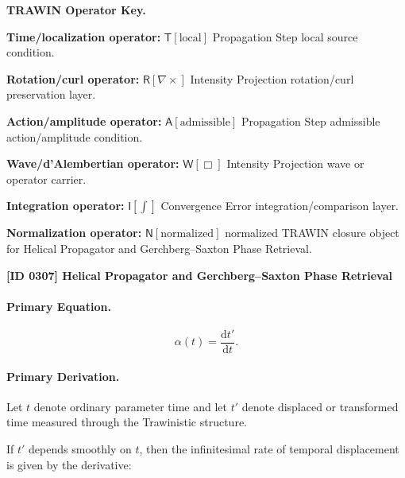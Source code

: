 \par\vspace{0.45\baselineskip}
\noindent\begin{minipage}[t]{\linewidth}
\begingroup
\small
\raggedright
\textbf{TRAWIN Operator Key.}\par
\noindent\textbf{Time/localization operator:} $\mathsf{T}\!\left[\mathrm{local}\right]$ Propagation Step local source condition.\par
\noindent\textbf{Rotation/curl operator:} $\mathsf{R}\!\left[\nabla\times\right]$ Intensity Projection rotation/curl preservation layer.\par
\noindent\textbf{Action/amplitude operator:} $\mathsf{A}\!\left[\mathrm{admissible}\right]$ Propagation Step admissible action/amplitude condition.\par
\noindent\textbf{Wave/d'Alembertian operator:} $\mathsf{W}\!\left[\Box\right]$ Intensity Projection wave or operator carrier.\par
\noindent\textbf{Integration operator:} $\mathsf{I}\!\left[\int\right]$ Convergence Error integration/comparison layer.\par
\noindent\textbf{Normalization operator:} $\mathsf{N}\!\left[\mathrm{normalized}\right]$ normalized TRAWIN closure object for Helical Propagator and Gerchberg--Saxton Phase Retrieval.\par
\endgroup
\end{minipage}

\clearpage
\noindent\textbf{[ID 0307] Helical Propagator and Gerchberg--Saxton Phase Retrieval}\par
\vspace{0.35em}
\paragraph{Primary Equation.}
\begin{equation}
\alpha(t)=\frac{\mathrm{d}t'}{\mathrm{d}t}.
\end{equation}

\paragraph{Primary Derivation.}
Let $t$ denote ordinary parameter time and let $t'$ denote displaced or transformed time measured through the Trawinistic structure.

If $t'$ depends smoothly on $t$, then the infinitesimal rate of temporal displacement is given by the derivative:

